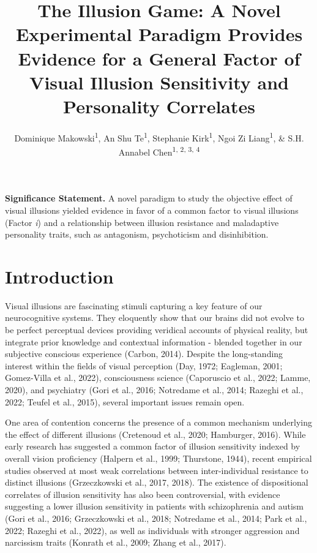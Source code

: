 \documentclass[
  man,floatsintext]{apa6}
\title{\textbf{The Illusion Game: A Novel Experimental Paradigm Provides Evidence for a General Factor of Visual Illusion Sensitivity and Personality Correlates}}
\author{Dominique Makowski\textsuperscript{1}, An Shu Te\textsuperscript{1}, Stephanie Kirk\textsuperscript{1}, Ngoi Zi Liang\textsuperscript{1}, \& S.H. Annabel Chen\textsuperscript{1, 2, 3, 4}}
\date{}
\affiliation{\vspace{0.5cm}\textsuperscript{1} School of Social Sciences, Nanyang Technological University, Singapore\\\textsuperscript{2} LKC Medicine, Nanyang Technological University, Singapore\\\textsuperscript{3} National Institute of Education, Singapore\\\textsuperscript{4} Centre for Research and Development in Learning, Nanyang Technological University, Singapore}
\begin{document}
\maketitle

\textbf{Significance Statement.} A novel paradigm to study the objective effect of visual illusions yielded evidence in favor of a common factor to visual illusions (Factor \emph{i}) and a relationship between illusion resistance and maladaptive personality traits, such as antagonism, psychoticism and disinhibition.

\hypertarget{introduction}{%
\section{Introduction}\label{introduction}}

Visual illusions are fascinating stimuli capturing a key feature of our neurocognitive systems. They eloquently show that our brains did not evolve to be perfect perceptual devices providing veridical accounts of physical reality, but integrate prior knowledge and contextual information - blended together in our subjective conscious experience (Carbon, 2014). Despite the long-standing interest within the fields of visual perception (Day, 1972; Eagleman, 2001; Gomez-Villa et al., 2022), consciousness science (Caporuscio et al., 2022; Lamme, 2020), and psychiatry (Gori et al., 2016; Notredame et al., 2014; Razeghi et al., 2022; Teufel et al., 2015), several important issues remain open.

One area of contention concerns the presence of a common mechanism underlying the effect of different illusions (Cretenoud et al., 2020; Hamburger, 2016). While early research has suggested a common factor of illusion sensitivity indexed by overall vision proficiency (Halpern et al., 1999; Thurstone, 1944), recent empirical studies observed at most weak correlations between inter-individual resistance to distinct illusions (Grzeczkowski et al., 2017, 2018). The existence of dispositional correlates of illusion sensitivity has also been controversial, with evidence suggesting a lower illusion sensitivity in patients with schizophrenia and autism (Gori et al., 2016; Grzeczkowski et al., 2018; Notredame et al., 2014; Park et al., 2022; Razeghi et al., 2022), as well as individuals with stronger aggression and narcissism traits (Konrath et al., 2009; Zhang et al., 2017).
\end{document}
